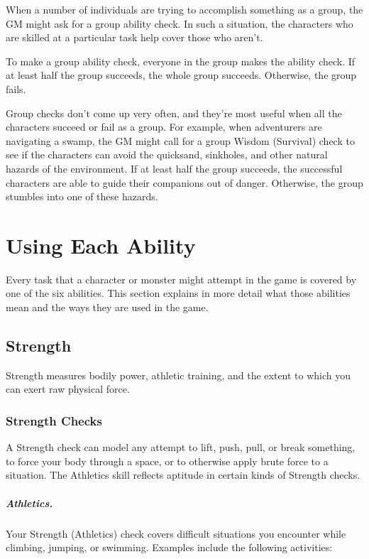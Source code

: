When a number of individuals are trying to accomplish something as a group, the GM might ask for a group ability check. In such a situation, the characters who are skilled at a particular task help cover those who aren't.

To make a group ability check, everyone in the group makes the ability check. If at least half the group succeeds, the whole group succeeds. Otherwise, the group fails.

Group checks don't come up very often, and they're most useful when all the characters succeed or fail as a group. For example, when adventurers are navigating a swamp, the GM might call for a group Wisdom (Survival) check to see if the characters can avoid the quicksand, sinkholes, and other natural hazards of the environment. If at least half the group succeeds, the successful characters are able to guide their companions out of danger. Otherwise, the group stumbles into one of these hazards.

\section{Using Each Ability}

Every task that a character or monster might attempt in the game is covered by one of the six abilities. This section explains in more detail what those abilities mean and the ways they are used in the game.

\subsection{Strength}

Strength measures bodily power, athletic training, and the extent to which you can exert raw physical force.

\subsubsection{Strength Checks}

A Strength check can model any attempt to lift, push, pull, or break something, to force your body through a space, or to otherwise apply brute force to a situation. The Athletics skill reflects aptitude in certain kinds of Strength checks.

\subparagraph*{Athletics.} Your Strength (Athletics) check covers difficult situations you encounter while climbing, jumping, or swimming. Examples include the following activities:

